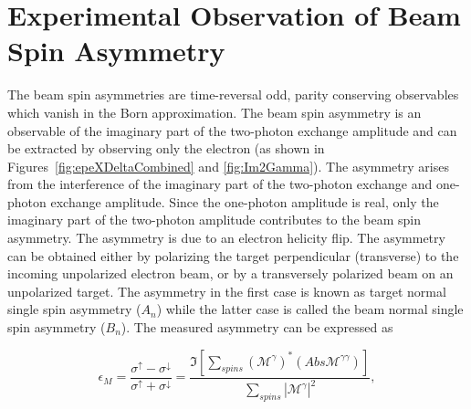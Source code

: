 \section{Experimental Observation of Beam Spin Asymmetry}
\label{Experimental Observation of Beam Spin Asymmetry}

The beam spin asymmetries are time-reversal odd, parity conserving observables which vanish in the Born approximation. The beam spin asymmetry is an observable of the imaginary part of the two-photon exchange amplitude and can be extracted by observing only the electron (as shown in Figures~\ref{fig:epeXDeltaCombined} and \ref{fig:Im2Gamma}). The asymmetry arises from the interference of the imaginary part of the two-photon exchange and one-photon exchange amplitude. Since the one-photon amplitude is real, only the imaginary part of the two-photon amplitude contributes to the beam spin asymmetry. The asymmetry is due to an electron helicity flip. 
The asymmetry can be obtained either by polarizing the target perpendicular (transverse) to the incoming unpolarized electron beam, or by a transversely polarized beam on an unpolarized target. 
The asymmetry in the first case is known as target normal single spin asymmetry ($A_{n}$) while the latter case is called the beam normal single spin asymmetry ($B_{n}$). The measured asymmetry can be expressed as 

%
\begin{equation} \label{equ:transverse20}
\epsilon_{M} = \frac{\sigma^{\uparrow} - \sigma^{\downarrow} }{\sigma^{\uparrow} + \sigma^{\downarrow}} = \frac{\Im \left[ \sum\limits_{spins} (\mathcal{M}^{\gamma})^{*}(Abs\mathcal{M}^{\gamma\gamma}) \right] }{\sum\limits_{spins} |\mathcal{M}^{\gamma}|^{2} },
\end{equation}

